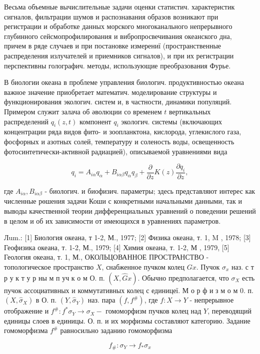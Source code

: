 \documentclass[10pt]{article}
\begin{document}
Весьма объемные вычислительные задачи оценки статистич. характеристик сигналов, фильтрации шумов и распознавания образов возникают при регистрации и обработке данных морского многоканального непрерывного глубинного сейсмопрофилирования и вибропросвечивания океанского дна, причем в ряде случаев и при постановке измерениї (пространственные распределения излучателей и приемников сигналов), и при их регистрации перспективны голографич. методы, использующие преобразования Фурье.

В биологии океана в проблеме управления биологич. продуктивностью океана важное значение приобретает математич. моделирование структуры и функционирования экологич. систем и, в частности, динамики популяций. Примером служит залача об әволюции со временем $t$ вертикальных распределений $q_{i}(z, t)$ компонент $q_{i}$ экологич. системы (включающих концентрации ряда видов фито- и зоопланктона, кислорода, углекислого газа, фосфорных и азотных солей, температуру и соленость воды, освещенность фотосинтетически-активной радиацией), описываемой уравнениями вида

\[
q_{i}=A_{i \alpha} q_{\alpha}+B_{i \alpha \beta} q_{\alpha} q_{\beta}+\frac{\partial}{\partial z} K(z) \frac{\partial q_{i}}{\partial z},
\]

где $A_{i \alpha}, B_{i \alpha \beta}$ - биологич. и биофизич. параметры; здесь представляют интерес как численные рөшения задачи Коши с конкретными начальными данными, так и выводы качественной теории дифференциальных уравнений о поведении решений в целом и об их зависимости от имеющихся в уравнениях параметров.

Лum.: [1] Биология океана, т 1-2, М., 1977; [2] Физика океана, т. 1, M , 1978; [3] Геофизика океана, т. 1-2, М., 1979; [4] Химия океана, т. 1-2, М , 1979, [5] Геология океана, т. 1, М., ОКОЛЬЦОВАННОЕ ПРОСТРАНСТВО - топологическое пространство $X$, снабженное пучком колец $G x$. Пучок $\sigma_{x}$ наз. с т р у к т у р ны м п уч к о м О. п. $(X, \widehat{G} x)$. Обычно предполагается, что $\sigma_{X}$ есть пучок ассоциативных и коммутативных колец с единицеї. М о р ф и з м о м 0. п. $\left(X, \widehat{\sigma}_{X}\right)$ в О. п. $\left(Y, \widehat{\sigma}_{Y}\right)$ наз. пара $\left(f, f^{\#}\right)$, где $f: X \rightarrow Y$ - непрерывное отображение и $f^{\#}: f^{*} \sigma_{Y} \rightarrow \sigma_{X}-$ гомоморфизм пучков колец над $Y$, переводящий единицы слоев в единицы. О. п. и их морфизмы составляют категорию. Задание гомоморфизма $f^{\#}$ равносильно заданию гомоморфизма

\[
f_{\#}: \sigma_{Y} \longrightarrow f_{*} \sigma_{x}
\]
\end{document}
